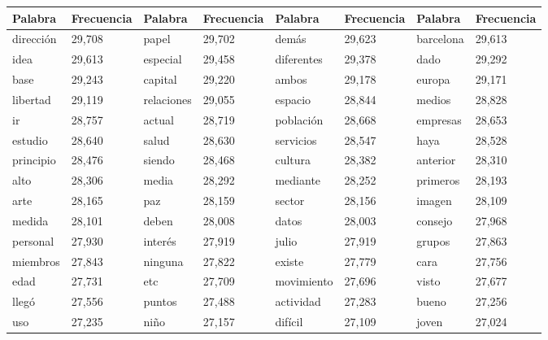 \begin{table}
\begin{tabular}{|l|l|l|l|l|l|l|l|}


\hline

Palabra & Frecuencia & Palabra & Frecuencia & Palabra & Frecuencia & Palabra & Frecuencia  \\

	\hline
   
   direcci\'on	&   29,708	  &
   papel	  & 29,702	   &
   dem\'as  	&   29,623	   &
   barcelona	&   29,613	   \\
   idea	 &  29,613	   &
   especial	&   29,458	   &
   diferentes	&   29,378	   &
   dado 	 &  29,292	   \\
   base 	 &  29,243	 &
   capital	 &  29,220	   &
   ambos  	 &  29,178	&
   europa 	 &  29,171	  \\
   libertad	 &  29,119	   &
   relaciones	&   29,055	   &
   espacio 	  & 28,844	   &
   medios 	 &  28,828	   \\
   ir	  & 28,757	   &
   actual	&   28,719	   &
   poblaci\'on	&   28,668	   &
   empresas  	&   28,653	   \\
   estudio	  & 28,640	   &
   salud	 &  28,630	   &
   servicios	&   28,547	  &
   haya 	  & 28,528	  \\
   principio	&   28,476	   &
   siendo	  & 28,468	   &
   cultura	  & 28,382	   &
   anterior	  & 28,310	   \\
   alto	  & 28,306	   &
   media 	&   28,292	   &
   mediante &	   28,252	   &
   primeros	 &  28,193	   \\
   arte	 &  28,165	 &
   paz 	 &  28,159	  &
   sector	&   28,156	  &
   imagen 	&   28,109	 \\
   medida 	 &  28,101	  &
   deben 	 &  28,008	   &
   datos	 &  28,003	   &
   consejo 	 &  27,968	  \\
   personal	 &  27,930	 &
   inter\'es	&   27,919	&
   julio	  & 27,919	  &
   grupos 	  & 27,863\\
   miembros  &	   27,843 &
   ninguna 	 &  27,822	  &
   existe	  & 27,779	 &
   cara	  & 27,756	   \\
   edad 	&   27,731	 &
   etc	  & 27,709	   &
   movimiento &	   27,696	&
   visto	  & 27,677	   \\
   lleg\'o	  & 27,556	   &
   puntos 	  & 27,488	   &
   actividad	&   27,283	   &
   bueno 	  & 27,256	  \\
   uso 	  & 27,235	  &
   ni\~no	&   27,157	   &
   dif\'icil	&   27,109	   &
   joven	  & 27,024	 \\

\end{tabular}
\end{table}
